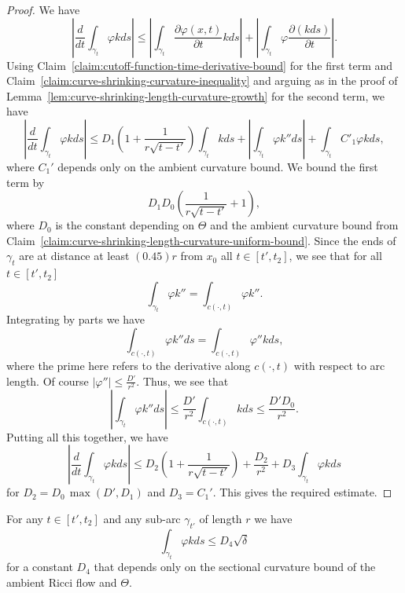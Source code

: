 \begin{proof}
We have
$$\left|\frac{d}{dt}\int_{\gamma_t}\varphi
kds\right|\le\left|\int_{\gamma_t}\frac{\partial
\varphi(x,t)}{\partial
t}kds\right|+\left|\int_{\gamma_t}\varphi\frac{\partial
(kds)}{\partial t}\right|.$$ Using Claim~\ref{claim:cutoff-function-time-derivative-bound} for the first
term and Claim~\ref{claim:curve-shrinking-curvature-inequality} and arguing as in the proof of
Lemma~\ref{lem:curve-shrinking-length-curvature-growth} for the second term, we have
$$\left|\frac{d}{dt}\int_{\gamma_t}\varphi
kds\right|\le
D_1\left(1+\frac{1}{r\sqrt{t-t'}}\right)\int_{\gamma_t}kds+\left|\int_{\gamma_t}
\varphi k''ds\right|+\int_{\gamma_t}C'_1\varphi kds,$$ where $C_1'$
depends only on the ambient curvature bound. We bound the first term
by
$$D_1D_0\left(\frac{1}{r\sqrt{t-t'}}+1\right),$$
where $D_0$ is the constant depending on $\Theta$ and the ambient
curvature bound from Claim~\ref{claim:curve-shrinking-length-curvature-uniform-bound}. Since the ends of
$\gamma_t$ are at distance at least $(0.45)r$ from $x_0$ all $t\in
[t',t_2]$, we see that for all $t\in [t',t_2]$
$$\int_{\gamma_t}\varphi k''=\int_{c(\cdot,t)}\varphi k''.$$
Integrating by parts we have
$$\int_{c(\cdot,t)} \varphi k'' ds=\int_{c(\cdot,t)}\varphi'' k ds,$$
where the prime here refers to the derivative along $c(\cdot,t)$
with respect to arc length. Of course $|\varphi''|\le
\frac{D'}{r^2}$. Thus, we see that
$$\left|\int_{\gamma_t}\varphi k''ds\right|\le
\frac{D'}{r^2}\int_{c(\cdot,t)}kds\le \frac{D'D_0}{r^2}.$$ Putting
all this together, we have
$$\left|\frac{d}{dt}\int_{\gamma_t}\varphi
kds\right|\le
D_2\left(1+\frac{1}{r\sqrt{t-t'}}\right)+\frac{D_2}{r^2}+D_3\int_{\gamma_t}\varphi
kds$$ for $D_2=D_0\,\max(D',D_1)$ and $D_3=C_1'$. This gives
the required estimate.
\end{proof}

\begin{corollary}
\label{cor:cutoff-weighted-curvature-integral-sqrt-bound}
For any $t\in [t',t_2]$  and any sub-arc $\gamma_{t'}$ of length $r$
we have
$$\int_{\gamma_t}\varphi kds
\le  D_4\sqrt{\delta}$$ for a constant $D_4$ that depends only on
the sectional curvature bound of the ambient Ricci flow and
$\Theta$.
\end{corollary}

